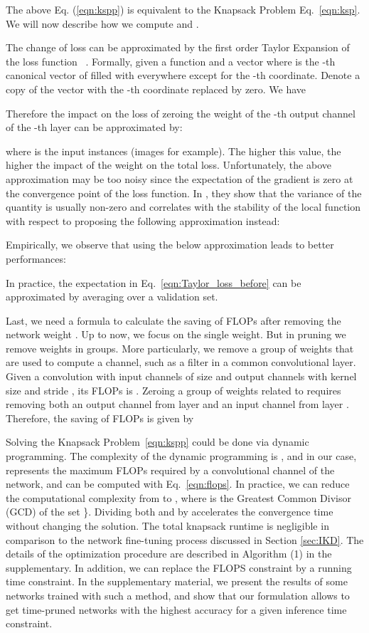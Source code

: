 \documentclass{article}
\begin{document}
The above Eq. (\ref{eqn:kspp}) is equivalent to the Knapsack Problem Eq.~\eqref{eqn:ksp}. We will now describe how we compute  and .

The change of loss  can be approximated by the first order Taylor Expansion of the loss function ~\cite{DBLP:conf/iclr/MolchanovTKAK17}. 
Formally, given a function  and a vector  where  is the -th canonical vector of  filled with  everywhere except for the -th coordinate. Denote  a copy of the vector  with the -th coordinate replaced by zero. We have

Therefore the impact on the loss of zeroing the weight  of the -th output channel of the -th layer can be approximated by:

where  is the input instances (images for example).
The higher this value, the higher the impact of the weight on the total loss. Unfortunately, the above approximation may be too noisy  since the expectation of the gradient is zero at the convergence point of the loss function. In \cite{DBLP:conf/iclr/MolchanovTKAK17}, they show that the variance of the quantity  is usually non-zero and correlates with the stability of the local function with respect to  proposing the following approximation instead:



Empirically, we observe that using the below approximation leads to better performances:


In practice, the expectation in Eq.~\eqref{eqn:Taylor_loss_before} can be approximated by averaging over a validation set. 

Last, we need a formula to calculate the saving of FLOPs  after removing the network weight . Up to now, we focus on the single weight. But in pruning we remove weights in groups. More particularly, we remove a group of weights that are used to compute a channel, such as a filter in a common convolutional layer. Given a convolution with  input channels of size  and  output channels with kernel size  and stride , its FLOPs is . 
Zeroing a group of weights related to  requires removing both an output channel from layer  and an input channel from layer . Therefore, the saving of FLOPs is given by 


Solving the Knapsack Problem~\eqref{eqn:kspp} could be done via dynamic programming.
The complexity of the dynamic programming is , and in our case,  represents the maximum FLOPs required by a convolutional channel of the network, and can be computed with Eq.~\eqref{eqn:flops}. In practice, we can reduce the computational complexity from  to , 
where  is the Greatest Common Divisor (GCD) of the set \}. Dividing both  and  by  accelerates the convergence time without changing the solution. The total knapsack runtime is negligible in comparison to the network fine-tuning process discussed in Section \ref{sec:IKD}. 
The details of the optimization procedure are described in Algorithm (1) in the supplementary. In addition, we can replace the FLOPS constraint by a running time constraint. In the supplementary material, we present the results of some networks trained with such a method, and show that our formulation allows to get time-pruned networks with the highest accuracy for a given inference time constraint. 
\end{document}

